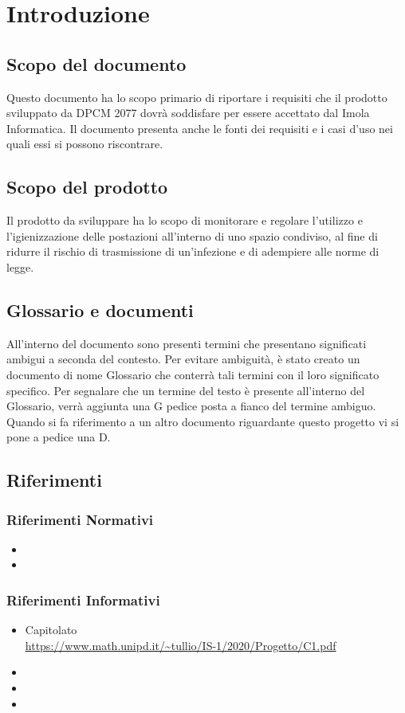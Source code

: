 \section{Introduzione}

\subsection{Scopo del documento}
Questo documento ha lo scopo primario di riportare i requisiti che il prodotto sviluppato da DPCM 2077 dovrà soddisfare per essere accettato dal  Imola Informatica.
Il documento presenta anche le fonti dei requisiti e i casi d'uso nei quali essi si possono riscontrare.
\subsection{Scopo del prodotto}
Il prodotto da sviluppare ha lo scopo di monitorare e regolare l'utilizzo e l'igienizzazione delle postazioni all'interno di uno spazio condiviso, al fine di ridurre il rischio di trasmissione di un'infezione e di adempiere alle norme di legge. 
\subsection{Glossario e documenti} 
All'interno del  documento sono presenti termini che presentano significati ambigui a seconda del contesto.
Per evitare ambiguità, è stato creato un  documento di nome Glossario che  conterrà tali termini con il loro significato specifico. Per segnalare che un termine del testo è presente all'interno del Glossario, verrà aggiunta una G pedice posta a fianco del termine ambiguo.
Quando si fa riferimento a un altro documento riguardante questo progetto vi si pone a pedice una D.
\subsection{Riferimenti}
\subsubsection{Riferimenti Normativi}
\begin{itemize}
	\item {}
	\item {}
\end{itemize}

\subsubsection{Riferimenti Informativi}
\begin{itemize}
	\item{Capitolato \\
		\url{https://www.math.unipd.it/~tullio/IS-1/2020/Progetto/C1.pdf}}
	\item {}
	\item {}
	\item {}
\end{itemize}